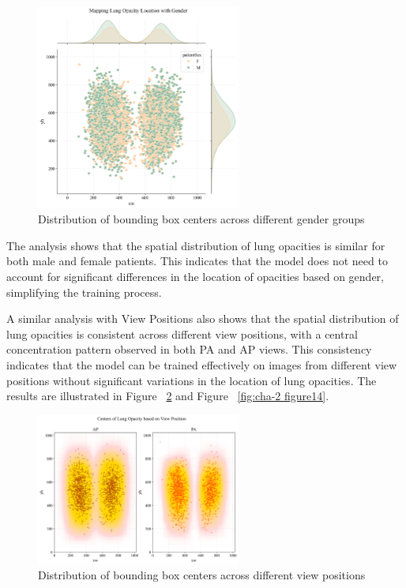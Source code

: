 \begin{figure}[H]
    \begin{center}
        \includegraphics[width = 0.6\textwidth]{figures/Figure17.png}
        \caption{Distribution of bounding box centers across different gender groups}
        \label{fig:cha-2 figure12}
    \end{center}
\end{figure}

The analysis shows that the spatial distribution of lung opacities is similar for both male and female patients. This indicates that the model does not need to account for significant differences in the location of opacities based on gender, simplifying the training process.

A similar analysis with View Positions also shows that the spatial distribution of lung opacities is consistent across different view positions, with a central concentration pattern observed in both PA and AP views. This consistency indicates that the model can be trained effectively on images from different view positions without significant variations in the location of lung opacities. The results are illustrated in Figure ~\ref{fig:cha-2 figure13} and Figure ~\ref{fig:cha-2 figure14}.

\begin{figure}[H]
    \begin{center}
        \includegraphics[width = 0.6\textwidth]{figures/Figure18.png}
        \caption{Distribution of bounding box centers across different view positions}
        \label{fig:cha-2 figure13}
    \end{center}
\end{figure}

